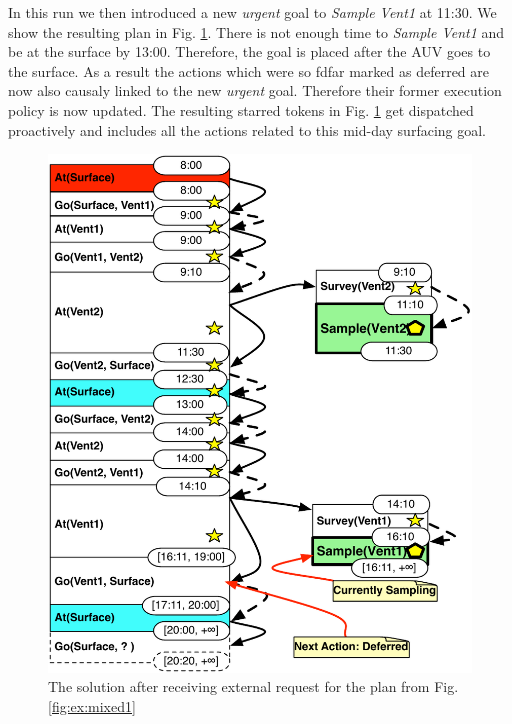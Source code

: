 
In this run we then introduced a new {\em urgent} goal to {\em Sample
Vent1} at 11:30. We show the resulting plan in
Fig. \ref{fig:ex:mixed2}. There is not enough
time to {\em Sample Vent1} and be at the surface by 13:00. Therefore,
the goal is placed after the AUV goes to the surface. As a result the
actions which were so fdfar marked as deferred are now also causaly
linked to the new {\em urgent} goal. Therefore their former execution
policy is now updated. The resulting starred tokens in
Fig. \ref{fig:ex:mixed2} get dispatched proactively and includes all
the actions related to this mid-day surfacing goal.

\begin{figure}[t]
  \centering
  \includegraphics[width=0.8\columnwidth]{figs/example_MixedUpdate}
  \caption{\small The solution after receiving external request for
    the plan from Fig. \ref{fig:ex:mixed1}}
  \label{fig:ex:mixed2}
\end{figure}

